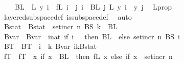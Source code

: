 \begin{isabellebody}
\ \ \ \ BL\ {}{\isachardot}{\kern0pt}\ L\ y\ i\ {\isacharequal}{\kern0pt}\ fL\ i{\isacharparenright}{\kern0pt}\ {\isasymand}\ {\isacharparenleft}{\kern0pt}{\isasymforall}j{\isacharless}{\kern0pt}{}{\isachardot}{\kern0pt}\ {\isasymforall}i\ {\isasymin}\ BL\ j{\isachardot}{\kern0pt}\ {\isacharparenleft}{\kern0pt}L\ y{\isacharparenright}{\kern0pt}\ i\ {\isacharequal}{\kern0pt}\ y\ j{\isacharparenright}{\kern0pt}{\isacharparenright}{\kern0pt}{\isachardoublequoteclose}\ \isamarkupfalse%
\ L{\isacharunderscore}{\kern0pt}prop\isanewline
\ \ \ \ \ \ \isamarkupfalse%
\ layered{\isacharunderscore}{\kern0pt}subspace{\isacharunderscore}{\kern0pt}def\ is{\isacharunderscore}{\kern0pt}subspace{\isacharunderscore}{\kern0pt}def\ \isamarkupfalse%
\ auto\isanewline
\isanewline
\ \ \ \ \isamarkupfalse%
\ Bstat\ \ {\isachardoublequoteopen}Bstat\ {\isasymequiv}\ set{\isacharunderscore}{\kern0pt}incr\ n\ {\isacharparenleft}{\kern0pt}BS\ k{\isacharparenright}{\kern0pt}\ {\isasymunion}\ BL\ {}{\isachardoublequoteclose}\isanewline
\ \ \ \ \isamarkupfalse%
\ Bvar\ \ {\isachardoublequoteopen}Bvar\ {\isasymequiv}\ {\isacharparenleft}{\kern0pt}{\isasymlambda}i{\isacharcolon}{\kern0pt}{\isacharcolon}{\kern0pt}nat{\isachardot}{\kern0pt}\ {\isacharparenleft}{\kern0pt}if\ i\ {\isacharequal}{\kern0pt}\ {}\ then\ BL\ {}\ else\ set{\isacharunderscore}{\kern0pt}incr\ n\ {\isacharparenleft}{\kern0pt}BS\ {\isacharparenleft}{\kern0pt}i\ {\isacharminus}{\kern0pt}\ {}{\isacharparenright}{\kern0pt}{\isacharparenright}{\kern0pt}{\isacharparenright}{\kern0pt}{\isacharparenright}{\kern0pt}{\isachardoublequoteclose}\isanewline
\ \ \ \ \isamarkupfalse%
\ BT\ \ {\isachardoublequoteopen}BT\ {\isasymequiv}\ {\isacharparenleft}{\kern0pt}{\isasymlambda}i\ {\isasymin}\ {\isacharbraceleft}{\kern0pt}{\isachardot}{\kern0pt}{\isachardot}{\kern0pt}{\isacharless}{\kern0pt}k{\isacharplus}{\kern0pt}{}{\isacharbraceright}{\kern0pt}{\isachardot}{\kern0pt}\ Bvar\ i{\isacharparenright}{\kern0pt}{\isacharparenleft}{\kern0pt}{\isacharparenleft}{\kern0pt}k{\isacharplus}{\kern0pt}{}{\isacharparenright}{\kern0pt}{\isacharcolon}{\kern0pt}{\isacharequal}{\kern0pt}Bstat{\isacharparenright}{\kern0pt}{\isachardoublequoteclose}\isanewline
\ \ \ \ \isamarkupfalse%
\ fT\ \ {\isachardoublequoteopen}fT\ {\isasymequiv}\ {\isacharparenleft}{\kern0pt}{\isasymlambda}x{\isachardot}{\kern0pt}\ {\isacharparenleft}{\kern0pt}if\ x\ {\isasymin}\ BL\ {}\ then\ fL\ x\ else\ {\isacharparenleft}{\kern0pt}if\ x\ {\isasymin}\ set{\isacharunderscore}{\kern0pt}incr\ n\isanewline

\end{isabellebody}
